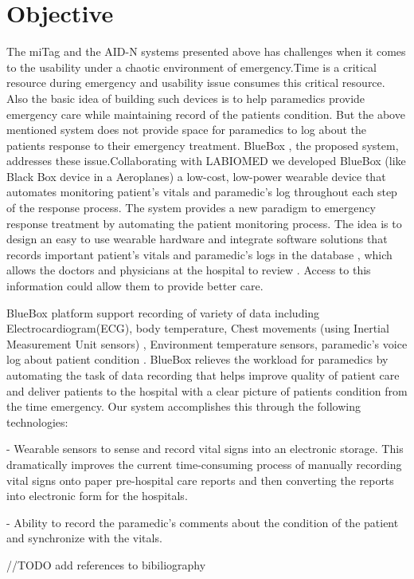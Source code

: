 \section{Objective}
The miTag and the AID-N systems presented above has challenges when it comes to the usability under a chaotic environment of emergency.Time is a critical resource during emergency and usability issue consumes this critical resource. Also the basic idea of building such devices is to help paramedics provide emergency care while maintaining record of the patients condition. But the above mentioned system does not provide space for paramedics to log about the patients response to their emergency treatment. BlueBox , the proposed system, addresses these issue.Collaborating with LABIOMED we developed BlueBox (like Black Box device in a Aeroplanes) a low-cost, low-power wearable device that automates monitoring patient’s vitals and paramedic's log throughout each step of the response process.  The system provides a new paradigm to emergency response treatment by automating the patient monitoring process. The idea is to design an easy to use wearable hardware and integrate software solutions that records important  patient’s vitals and paramedic's logs in the database , which allows the doctors and physicians at the hospital to review . Access to this information could allow them to provide better care.

BlueBox  platform support recording of variety of data including Electrocardiogram(ECG), body temperature, Chest movements (using Inertial Measurement Unit sensors) , Environment temperature sensors, paramedic’s voice log about patient condition . BlueBox relieves the workload for paramedics by automating the task of data recording that helps improve quality of patient care and deliver patients to the hospital with a clear picture of patients condition from the time emergency. Our system accomplishes this through the following technologies:


-	Wearable sensors to sense and record vital signs into an electronic storage. This dramatically improves the current time-consuming process of manually recording vital signs onto paper pre-hospital care reports and then converting the reports into electronic form for the hospitals.


-	Ability to record the paramedic’s comments about the condition of the patient and synchronize with the vitals.

//TODO add references to bibiliography

